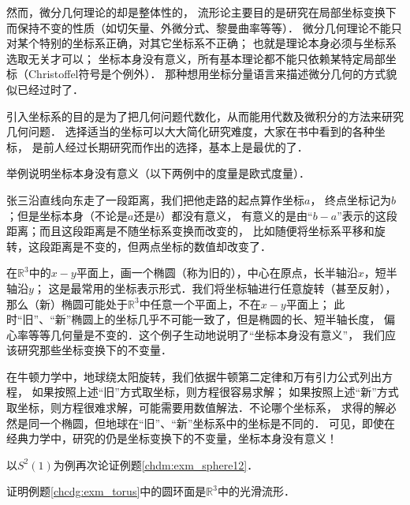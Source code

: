 然而，微分几何理论的却是整体性的，
流形论主要目的是研究在局部坐标变换下而保持不变的性质（如切矢量、外微分式、黎曼曲率等等）．
微分几何理论不能只对某个特别的坐标系正确，对其它坐标系不正确；
也就是理论本身必须与坐标系选取无关才可以；
坐标本身没有意义，所有基本理论都不能只依赖某特定局部坐标（Christoffel符号是个例外）．
那种想用坐标分量语言来描述微分几何的方式貌似已经过时了．



引入坐标系的目的是为了把几何问题代数化，从而能用代数及微积分的方法来研究几何问题．
选择适当的坐标可以大大简化研究难度，大家在书中看到的各种坐标，
是前人经过长期研究而作出的选择，基本上是最优的了．


举例说明坐标本身没有意义（以下两例中的度量是欧式度量）．
\begin{example}
    张三沿直线向东走了一段距离，我们把他走路的起点算作坐标$a$，
    终点坐标记为$b$；但是坐标本身（不论是$a$还是$b$）都没有意义，
    有意义的是由“$b-a$”表示的这段距离；而且这段距离是不随坐标系变换而改变的，
    比如随便将坐标系平移和旋转，这段距离是不变的，但两点坐标的数值却改变了．
\end{example}

\begin{example}\label{chdm:exam_tuoyuan}
    在$\mathbb{R}^3$中的$x-y$平面上，画一个椭圆（称为旧的），中心在原点，长半轴沿$x$，短半轴沿$y$；
    这是最常用的坐标表示形式．我们将坐标轴进行任意旋转（甚至反射），
    那么（新）椭圆可能处于$\mathbb{R}^3$中任意一个平面上，不在$x-y$平面上；
    此时“旧”、“新”椭圆上的坐标几乎不可能一致了，但是椭圆的长、短半轴长度，
    偏心率等等几何量是不变的．这个例子生动地说明了“坐标本身没有意义”，
    我们应该研究那些坐标变换下的不变量．
    
    在牛顿力学中，地球绕太阳旋转，我们依据牛顿第二定律和万有引力公式列出方程，
    如果按照上述“旧”方式取坐标，则方程很容易求解；
    如果按照上述“新”方式取坐标，则方程很难求解，可能需要用数值解法．不论哪个坐标系，
    求得的解必然是同一个椭圆，但地球在“旧”、“新”坐标系中的坐标是不同的．
    可见，即使在经典力学中，研究的仍是坐标变换下的不变量，坐标本身没有意义！
\end{example}



\begin{exercise}
	以$S^2(1)$为例再次论证例题\ref{chdm:exm_sphere12}．
\end{exercise}

\begin{exercise}
	证明例题\ref{chcdg:exm_torus}中的圆环面是$\mathbb{R}^3$中的光滑流形．
\end{exercise}

